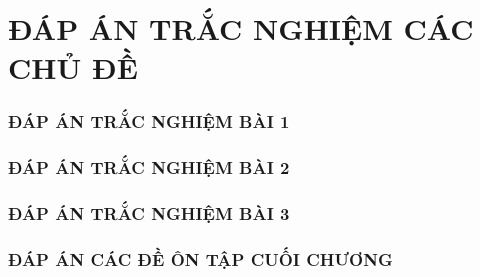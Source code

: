 \section*{ĐÁP ÁN TRẮC NGHIỆM CÁC CHỦ ĐỀ}
\setcounter{subsubsection}{0}
\subsubsection{ĐÁP ÁN TRẮC NGHIỆM BÀI 1}

\subsubsection{ĐÁP ÁN TRẮC NGHIỆM BÀI 2}

\subsubsection{ĐÁP ÁN TRẮC NGHIỆM BÀI 3}

\subsubsection{ĐÁP ÁN CÁC ĐỀ ÔN TẬP CUỐI CHƯƠNG}



